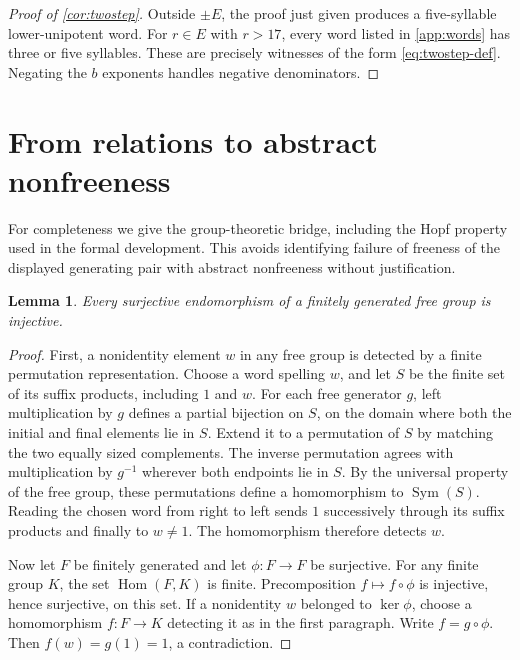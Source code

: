 \documentclass[11pt]{article}
\newtheorem{lemma}[theorem]{Lemma}
\theoremstyle{definition}
\theoremstyle{remark}
\numberwithin{equation}{section}
\begin{document}
\begin{proof}[Proof of \cref{cor:twostep}]
Outside $\pm E$, the proof just given produces a five-syllable
lower-unipotent word. For $r\in E$ with $r>17$, every word
listed in \cref{app:words} has three or five syllables. These
are precisely witnesses of the form \eqref{eq:twostep-def}.
Negating the $b$ exponents handles negative denominators.
\end{proof}

\section{From relations to abstract nonfreeness}\label{sec:nonfree}
For completeness we give the group-theoretic bridge, including
the Hopf property used in the formal development. This avoids
identifying failure of freeness of the displayed generating pair
with abstract nonfreeness without justification.

\begin{lemma}\label{lem:hopf}
Every surjective endomorphism of a finitely generated free group
is injective.
\end{lemma}
\begin{proof}
First, a nonidentity element $w$ in any free group is detected by
a finite permutation representation. Choose a word spelling $w$,
and let $S$ be the finite set of its suffix products, including $1$
and $w$. For each free generator $g$, left multiplication by $g$
defines a partial bijection on $S$, on the domain where both the
initial and final elements lie in $S$. Extend it to a permutation
of $S$ by matching the two equally sized complements. The inverse
permutation agrees with multiplication by $g^{-1}$ wherever both
endpoints lie in $S$. By the universal property of the free group,
these permutations define a homomorphism to $\operatorname{Sym}(S)$.
Reading the chosen word from right to left sends $1$ successively
through its suffix products and finally to $w\ne1$. The homomorphism
therefore detects $w$.

Now let $F$ be finitely generated and let $\phi:F\to F$ be
surjective. For any finite group $K$, the set
$\operatorname{Hom}(F,K)$ is finite. Precomposition
$f\mapsto f\circ\phi$ is injective, hence surjective, on this
set. If a nonidentity $w$ belonged to $\ker\phi$, choose a
homomorphism $f:F\to K$ detecting it as in the first paragraph.
Write $f=g\circ\phi$. Then $f(w)=g(1)=1$, a contradiction.
\end{proof}
\end{document}
